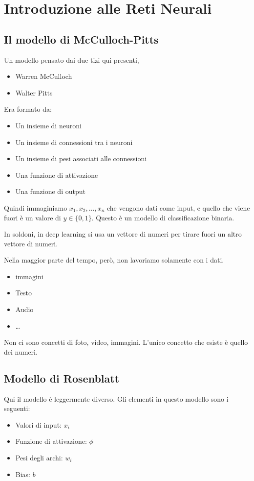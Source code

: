 \section{Introduzione alle Reti Neurali}
\subsection{Il modello di McCulloch-Pitts}
Un modello pensato dai due tizi qui presenti,
\begin{itemize}
    \item Warren McCulloch
    \item Walter Pitts

\end{itemize}

Era formato da:
\begin{itemize}
    \item Un insieme di neuroni
    \item Un insieme di connessioni tra i neuroni
    \item Un insieme di pesi associati alle connessioni
    \item Una funzione di attivazione
    \item Una funzione di output
\end{itemize}

Quindi immaginiamo $x_1, x_2, \dots, x_n$ che vengono dati come input, e quello
che viene fuori è un valore di $y \in \{0,1\}$. Questo è un modello di
classificazione binaria.

In soldoni, in deep learning si usa un vettore di numeri per tirare fuori un
altro vettore di numeri.

Nella maggior parte del tempo, però, non lavoriamo solamente con i dati.
\begin{itemize}
    \item immagini
    \item Testo
    \item Audio
    \item \dots
\end{itemize}
Non ci sono concetti di foto, video, immagini. L'unico concetto che esiste
è quello dei numeri.

\subsection{Modello di Rosenblatt}
Qui il modello è leggermente diverso. Gli elementi in questo modello sono i
seguenti:
\begin{itemize}
    \item Valori di input: $x_i$
    \item Funzione di attivazione: $\phi$
    \item Pesi degli archi: $w_i$
    \item Bias: $b$
\end{itemize}

